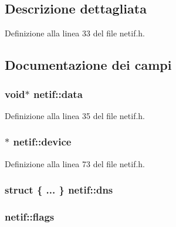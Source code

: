 \subsection{Descrizione dettagliata}


Definizione alla linea 33 del file netif.\+h.



\subsection{Documentazione dei campi}
\hypertarget{structnetif_af45fb467da3492eb4473cb9208044ac8}{
\subsubsection[{data}]{\setlength{\rightskip}{0pt plus 5cm}void$\ast$ netif\+::data}}\label{structnetif_af45fb467da3492eb4473cb9208044ac8}


Definizione alla linea 35 del file netif.\+h.

\hypertarget{structnetif_a8d0c9464b5010487798a5ea8adce5a39}{
\subsubsection[{device}]{$\ast$ netif\+::device}}\label{structnetif_a8d0c9464b5010487798a5ea8adce5a39}


Definizione alla linea 73 del file netif.\+h.

\hypertarget{structnetif_a30f1247e8e2ef8ac954833c81873608e}{
\subsubsection[{dns}]{\setlength{\rightskip}{0pt plus 5cm}struct \{ ... \}   netif\+::dns}}\label{structnetif_a30f1247e8e2ef8ac954833c81873608e}
\hypertarget{structnetif_a07586ae7a31c1231781af7394ce41659}{
\subsubsection[{flags}]{ netif\+::flags}}\label{structnetif_a07586ae7a31c1231781af7394ce41659}


